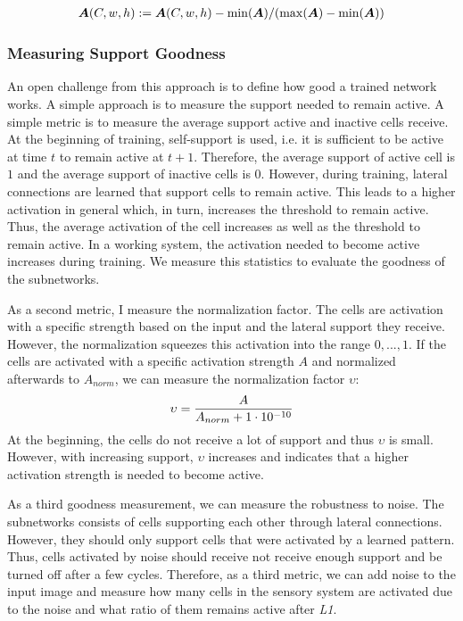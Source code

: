 \begin{align}\eqlbl{norm_lat3}
	\boldsymbol{A}(C,w,h) :=  \boldsymbol{A}(C,w,h)  - \min(\boldsymbol{A}) / (\max(\boldsymbol{A}) - \min(\boldsymbol{A}))
\end{align}


\subsubsection{Measuring Support Goodness}
An open challenge from this approach is to define how good a trained network works.
A simple approach is to measure the support needed to remain active.
A simple metric is to measure the average support active and inactive cells receive.
At the beginning of training, self-support is used, i.e. it is sufficient to be active at time $t$ to remain active at $t+1$.
Therefore, the average support of active cell is $1$ and the average support of inactive cells is $0$.
However, during training, lateral connections are learned that support cells to remain active.
This leads to a higher activation in general which, in turn, increases the threshold to remain active.
Thus, the average activation of the cell increases as well as the threshold to remain active.
In a working system, the activation needed to become active increases during training.
We measure this statistics to evaluate the goodness of the subnetworks.

As a second metric, I measure the normalization factor.
The cells are activation with a specific strength based on the input and the lateral support they receive.
However, the normalization squeezes this activation into the range $0, ..., 1$.
If the cells are activated with a specific activation strength $A$ and normalized afterwards to $A_{norm}$, we can measure the normalization factor 
$\upsilon$:
\begin{align}\eqlbl{goodness_lat}
	\upsilon = \frac{A}{A_{norm}+1\cdot10^{-10}}
\end{align}
At the beginning, the cells do not receive a lot of support and thus $\upsilon$ is small. However, with increasing support, $\upsilon$ increases and indicates that a higher activation strength is needed to become active.

As a third goodness measurement, we can measure the robustness to noise.
The subnetworks consists of cells supporting each other through lateral connections. However, they should only support cells that were activated by a learned pattern. Thus, cells activated by noise should receive not receive enough support and be turned off after a few cycles.
Therefore, as a third metric, we can add noise to the input image and measure how many cells  in the sensory system are activated due to the noise and what ratio of them remains active after \emph{L1}.


